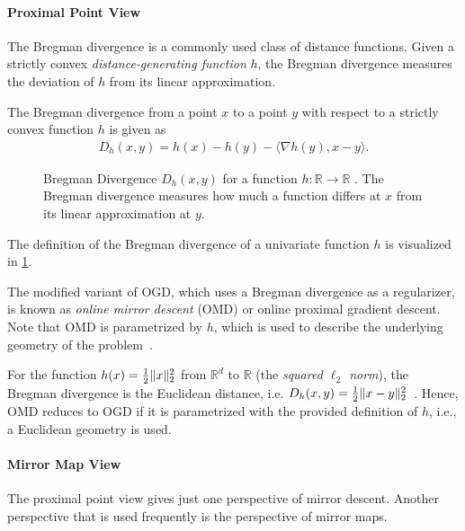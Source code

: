 \paragraph{Proximal Point View} The Bregman divergence is a commonly used class of distance functions. Given a strictly convex \emph{distance-generating function} $h$, the Bregman divergence measures the deviation of $h$ from its linear approximation.

\begin{definition}
\cite{Goel2018} The Bregman divergence from a point $x$ to a point $y$ with respect to a strictly convex function $h$ is given as \begin{align*}
    D_h(x,y) = h(x) - h(y) - \langle\nabla h(y), x - y\rangle.
\end{align*}
\end{definition}

\begin{figure}
    \centering
    
    \caption{Bregman Divergence $D_h(x,y)$ for a function $h : \mathbb{R} \to \mathbb{R}$ \cite{Goel2018}. The Bregman divergence measures how much a function differs at $x$ from its linear approximation at $y$.}
    \label{fig:bregman_divergence}
\end{figure}

The definition of the Bregman divergence of a univariate function $h$ is visualized in \cref{fig:bregman_divergence}.

The modified variant of OGD, which uses a Bregman divergence as a regularizer, is known as \emph{online mirror descent} (OMD) or online proximal gradient descent. Note that OMD is parametrized by $h$, which is used to describe the underlying geometry of the problem~\cite{Goel2018}.

For the function $h(x) = \frac{1}{2} \lVert x\rVert_2^2$ from $\mathbb{R}^d$ to $\mathbb{R}$ (the \emph{squared $\ell_2$ norm}), the Bregman divergence is the Euclidean distance, i.e. $D_h(x,y) = \frac{1}{2} \lVert x-y\rVert_2^2$~\cite{Goel2018}. Hence, OMD reduces to OGD if it is parametrized with the provided definition of $h$, i.e., a Euclidean geometry is used.

\paragraph{Mirror Map View} The proximal point view gives just one perspective of mirror descent. Another perspective that is used frequently is the perspective of mirror maps.

